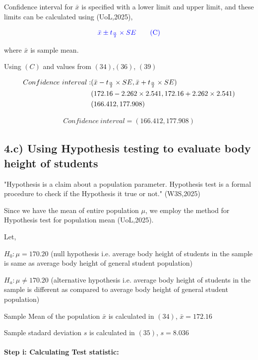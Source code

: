 \documentclass[a4paper]{report}
\begin{document}
Confidence interval for $\bar{x}$ is specified with a lower limit and upper limit, and these limits can be calculated using (UoL,2025),

\begin{equation*}
    \color{blue} \bar{x}\pm t_{\frac{\alpha}{2}} \times SE \tag{C}
\end{equation*}

where $\bar{x}$ is sample mean.

Using $(C)$ and values from $(34)$,$(36)$, $(39)$

\begin{align}
    \notag Confidence\ interval:& (\bar{x} - t_{\frac{\alpha}{2}} \times SE, \bar{x}+ t_{\frac{\alpha}{2}} \times SE) \\
    \notag &(172.16-2.262\times 2.541, 172.16+2.262\times 2.541 ) \\
    &(166.412,177.908)
\end{align}

\begin{align*}
    \boxed{Confidence\ interval=(166.412,177.908)}
\end{align*}

\subsection*{4.c) Using Hypothesis testing to evaluate body height of students }

"Hypothesis is a claim about a population parameter. Hypothesis test is a formal procedure to check if the Hypothesis it true or not." (W3S,2025)

Since we have the mean of entire population $\mu$, we employ the method for Hypothesis test for population mean (UoL,2025).

Let,

$H_0 :\mu = 170.20$ (null hypothesis i.e. average body height of students in the sample is same as average body height of general student population)

$H_a:\mu \neq 170.20$ (alternative hypothesis i.e. average body height of students in the sample is different as compared to average body height of general student population)

Sample Mean of the population $\bar{x}$ is calculated in $(34)$, $\bar{x}=172.16$

Sample stadard deviation $s$ is calculated in $(35)$, $s=8.036$



\paragraph{Step i: Calculating Test statistic:}
\end{document}
